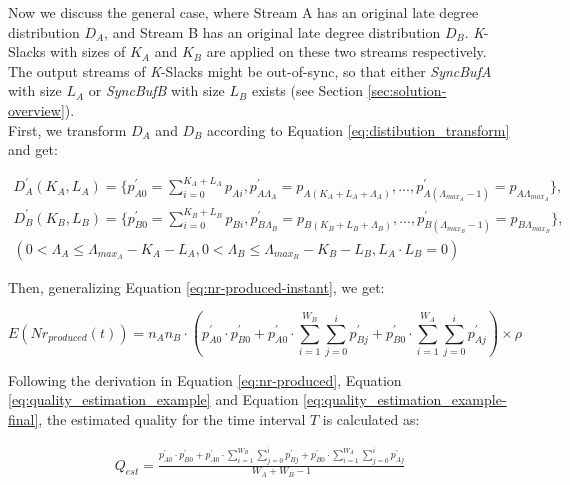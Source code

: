 \documentclass[a4paper, 11pt, twoside]{report}
\begin{document}
Now we discuss the general case, where Stream A has an original late degree distribution $D_A$, and Stream B has an original late degree distribution $D_B$. \textit{K}-Slacks with sizes of $K_A$ and $K_B$ are applied on these two streams respectively. The output streams of \textit{K}-Slacks might be out-of-sync, so that either \textit{SyncBufA} with size $L_A$ or \textit{SyncBufB} with size $L_B$ exists (see Section \ref{sec:solution-overview}).\\

First, we transform $D_A$ and $D_B$ according to Equation \ref{eq:distibution_transform} and get:

\begin{small}
\begin{equation}
\label{eq:distibution_transform_AB}
\begin{split}
D_A^{\prime}(K_A,L_A)= \{p^{\prime}_{A0}=\!\sum\limits_{i=0}^{K_A+L_A}p_{Ai}, p^{\prime}_{A\Lambda_A}=p_{A(K_A+L_A+\Lambda_A)}, ..., p^{\prime}_{A(\Lambda_{max_A}-1)} = p_{A\Lambda_{max_A}}\}, \\
D_B^{\prime}(K_B,L_B)= \{p^{\prime}_{B0}=\!\sum\limits_{i=0}^{K_B+L_B}p_{Bi}, p^{\prime}_{B\Lambda_B}=p_{B(K_B+L_B+\Lambda_B)}, ..., p^{\prime}_{B(\Lambda_{max_B}-1)} = p_{B\Lambda_{max_B}}\}, \\
(0 < \Lambda_A \leq \Lambda_{max_A}-K_A-L_A, 0 < \Lambda_B \leq \Lambda_{max_B}-K_B-L_B, L_A \cdot L_B=0)
\end{split}
\end{equation}
\end{small}

Then, generalizing Equation \ref{eq:nr-produced-instant}, we get:

\begin{equation}
E(Nr_{produced}(t))=n_A n_B \cdot (p_{A0}^{\prime} \cdot p_{B0}^{\prime} + p_{A0}^{\prime} \cdot \sum\limits_{i=1}^{W_B} \sum\limits_{j=0}^{i} p_{Bj}^{\prime} + p_{B0}^{\prime} \cdot \sum\limits_{i=1}^{W_A} \sum\limits_{j=0}^{i} p_{Aj}^{\prime}) \times \rho
\end{equation}

Following the derivation in Equation \ref{eq:nr-produced}, Equation \ref{eq:quality_estimation_example} and Equation \ref{eq:quality_estimation_example-final}, the estimated quality for the time interval $T$ is calculated as:

\begin{equation}
\label{eq:quality-estimation-final}
\begin{split}
Q_{est} = \frac{p_{A0}^{\prime} \cdot p_{B0}^{\prime} + p_{A0}^{\prime} \cdot \sum\limits_{i=1}^{W_B} \sum\limits_{j=0}^{i} p_{Bj}^{\prime} + p_{B0}^{\prime} \cdot \sum\limits_{i=1}^{W_A} \sum\limits_{j=0}^{i} p_{Aj}^{\prime}}{W_A+W_B-1}
\end{split}
\end{equation}
\end{document}
